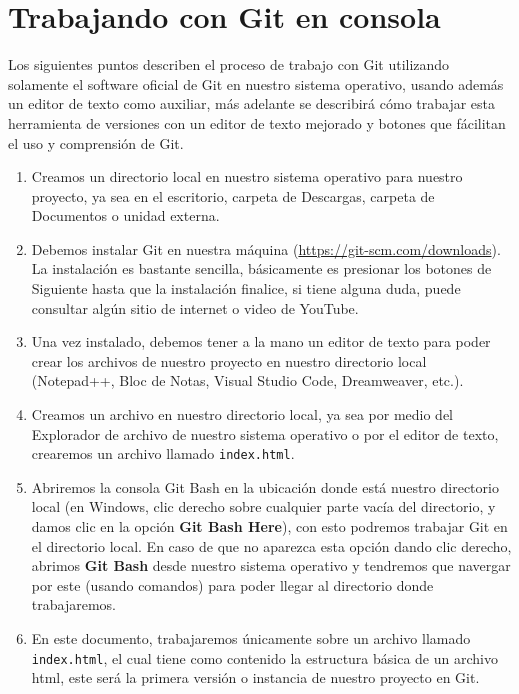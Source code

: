 




\section{Trabajando con Git en consola}
\hspace{0.55cm}Los siguientes puntos describen el proceso de trabajo con Git utilizando solamente el software oficial de Git en nuestro sistema operativo, usando además un editor de texto como auxiliar, más adelante se describirá cómo trabajar esta herramienta de versiones con un editor de texto mejorado y botones que fácilitan el uso y comprensión de Git.
\begin{enumerate}
    \item Creamos un directorio local en nuestro sistema operativo para nuestro proyecto, ya sea en el escritorio, carpeta de Descargas, carpeta de Documentos o unidad externa.
    \item Debemos instalar Git en nuestra máquina (\underline{https://git-scm.com/downloads}). La instalación es bastante sencilla, básicamente es presionar los botones de Siguiente hasta que la instalación finalice, si tiene alguna duda, puede consultar algún sitio de internet o video de YouTube.
    \item Una vez instalado, debemos tener a la mano un editor de texto para poder crear los archivos de nuestro proyecto en nuestro directorio local (Notepad++, Bloc de Notas, Visual Studio Code, Dreamweaver, etc.).
    \item Creamos un archivo en nuestro directorio local, ya sea por medio del Explorador de archivo de nuestro sistema operativo o por el editor de texto, crearemos un archivo llamado \texttt{index.html}.
    \item Abriremos la consola Git Bash en la ubicación donde está nuestro directorio local (en Windows, clic derecho sobre cualquier parte vacía del directorio, y damos clic en la opción \textbf{Git Bash Here}), con esto podremos trabajar Git en el directorio local. En caso de que no aparezca esta opción dando clic derecho, abrimos \textbf{Git Bash} desde nuestro sistema operativo y tendremos que navergar por este (usando comandos) para poder llegar al directorio donde trabajaremos.
    \item En este documento, trabajaremos únicamente sobre un archivo llamado \texttt{index.html}, el cual tiene como contenido la estructura básica de un archivo html, este será la primera versión o instancia de nuestro proyecto en Git.

\end{enumerate}
